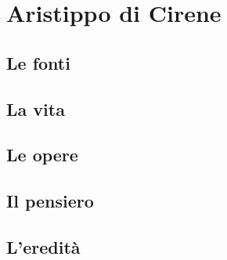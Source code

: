 \chapter{Aristippo di Cirene}

\section{Le fonti}

\section{La vita}

\section{Le opere}

\section{Il pensiero}

\section{L'eredità}
